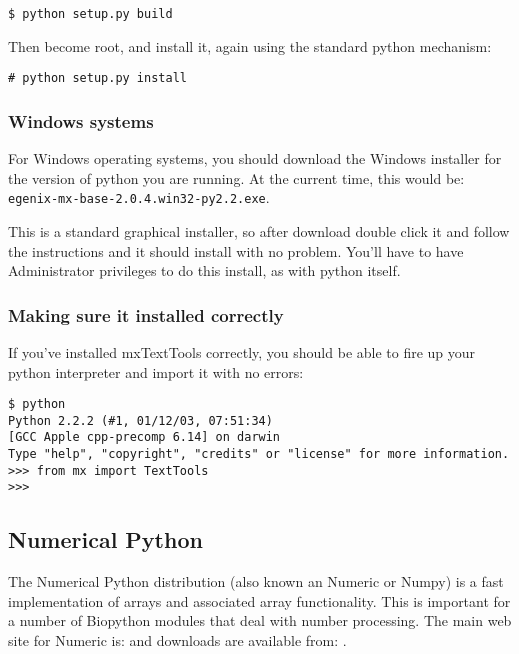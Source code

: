 \documentclass{article}
\begin{document}
\begin{verbatim}
$ python setup.py build
\end{verbatim}

Then become root, and install it, again using the standard python
mechanism:

\begin{verbatim}
# python setup.py install
\end{verbatim}

\subsubsection{Windows systems}

For Windows operating systems, you should download the Windows installer
for the version of python you are running. At the current time, this
would be: \verb|egenix-mx-base-2.0.4.win32-py2.2.exe|.


This is a standard graphical installer, so after download double click
it and follow the instructions and it should install with no problem.
You'll have to have Administrator privileges to do this install, as with
python itself.

\subsubsection{Making sure it installed correctly}

If you've installed mxTextTools correctly, you should be able to fire up
your python interpreter and import it with no errors:

\begin{verbatim}
$ python
Python 2.2.2 (#1, 01/12/03, 07:51:34) 
[GCC Apple cpp-precomp 6.14] on darwin
Type "help", "copyright", "credits" or "license" for more information.
>>> from mx import TextTools
>>> 
\end{verbatim}

\subsection{Numerical Python}

The Numerical Python distribution (also known an Numeric or Numpy) is a
fast implementation of arrays and associated array functionality. This
is important for a number of Biopython modules that deal with
number processing. The main web site for Numeric is:
 and downloads are
available from:
.
\end{document}
